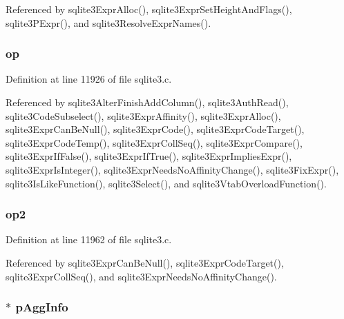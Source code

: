 Referenced by sqlite3\+Expr\+Alloc(), sqlite3\+Expr\+Set\+Height\+And\+Flags(), sqlite3\+P\+Expr(), and sqlite3\+Resolve\+Expr\+Names().

\hypertarget{struct_expr_a0991b29aa40e12f033237266ebe6610c}{}
\subsubsection[{op}]{ op}\label{struct_expr_a0991b29aa40e12f033237266ebe6610c}


Definition at line 11926 of file sqlite3.\+c.



Referenced by sqlite3\+Alter\+Finish\+Add\+Column(), sqlite3\+Auth\+Read(), sqlite3\+Code\+Subselect(), sqlite3\+Expr\+Affinity(), sqlite3\+Expr\+Alloc(), sqlite3\+Expr\+Can\+Be\+Null(), sqlite3\+Expr\+Code(), sqlite3\+Expr\+Code\+Target(), sqlite3\+Expr\+Code\+Temp(), sqlite3\+Expr\+Coll\+Seq(), sqlite3\+Expr\+Compare(), sqlite3\+Expr\+If\+False(), sqlite3\+Expr\+If\+True(), sqlite3\+Expr\+Implies\+Expr(), sqlite3\+Expr\+Is\+Integer(), sqlite3\+Expr\+Needs\+No\+Affinity\+Change(), sqlite3\+Fix\+Expr(), sqlite3\+Is\+Like\+Function(), sqlite3\+Select(), and sqlite3\+Vtab\+Overload\+Function().

\hypertarget{struct_expr_a37d7d563e3849872d9fbdf65c5625d18}{}
\subsubsection[{op2}]{ op2}\label{struct_expr_a37d7d563e3849872d9fbdf65c5625d18}


Definition at line 11962 of file sqlite3.\+c.



Referenced by sqlite3\+Expr\+Can\+Be\+Null(), sqlite3\+Expr\+Code\+Target(), sqlite3\+Expr\+Coll\+Seq(), and sqlite3\+Expr\+Needs\+No\+Affinity\+Change().

\hypertarget{struct_expr_a8d44bec2b506e6b367f1de588dbcae27}{}
\subsubsection[{p\+Agg\+Info}]{$\ast$ p\+Agg\+Info}\label{struct_expr_a8d44bec2b506e6b367f1de588dbcae27}


